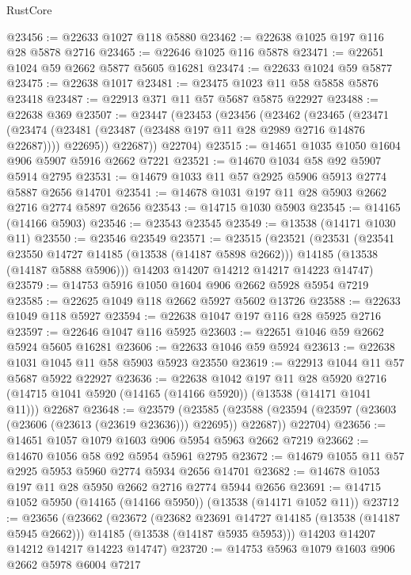 \begin{lexlean}{RustCore}
\begin{coremodule}
@23456 := @22633 @1027 @118 @5880
@23462 := @22638 @1025 @197 @116 @28 @5878 @2716
@23465 := @22646 @1025 @116 @5878
@23471 := @22651 @1024 @59 @2662 @5877 @5605 @16281
@23474 := @22633 @1024 @59 @5877
@23475 := @22638 @1017
@23481 := @23475 @1023 @11 @58 @5858 @5876 @23418
@23487 := @22913 @371 @11 @57 @5687 @5875 @22927
@23488 := @22638 @369
@23507 := @23447
    (@23453
      (@23456
        (@23462
          (@23465
            (@23471
              (@23474 (@23481 (@23487 (@23488 @197 @11 @28 @2989 @2716 @14876 @22687))))
              @22695))
          @22687))
      @22704)
@23515 := @14651 @1035 @1050 @1604 @906 @5907 @5916 @2662 @7221
@23521 := @14670 @1034 @58 @92 @5907 @5914 @2795
@23531 := @14679 @1033 @11 @57 @2925 @5906 @5913 @2774 @5887 @2656 @14701
@23541 := @14678 @1031 @197 @11 @28 @5903 @2662 @2716 @2774 @5897 @2656
@23543 := @14715 @1030 @5903
@23545 := @14165 (@14166 @5903)
@23546 := @23543 @23545
@23549 := @13538 (@14171 @1030 @11)
@23550 := @23546 @23549
@23571 := @23515
    (@23521
      (@23531
        (@23541 @23550 @14727 @14185 (@13538 (@14187 @5898 @2662)))
        @14185
        (@13538 (@14187 @5888 @5906)))
      @14203
      @14207
      @14212
      @14217
      @14223
      @14747)
@23579 := @14753 @5916 @1050 @1604 @906 @2662 @5928 @5954 @7219
@23585 := @22625 @1049 @118 @2662 @5927 @5602 @13726
@23588 := @22633 @1049 @118 @5927
@23594 := @22638 @1047 @197 @116 @28 @5925 @2716
@23597 := @22646 @1047 @116 @5925
@23603 := @22651 @1046 @59 @2662 @5924 @5605 @16281
@23606 := @22633 @1046 @59 @5924
@23613 := @22638 @1031 @1045 @11 @58 @5903 @5923 @23550
@23619 := @22913 @1044 @11 @57 @5687 @5922 @22927
@23636 := @22638
    @1042
    @197
    @11
    @28
    @5920
    @2716
    (@14715 @1041 @5920 (@14165 (@14166 @5920)) (@13538 (@14171 @1041 @11)))
    @22687
@23648 := @23579
    (@23585
      (@23588 (@23594 (@23597 (@23603 (@23606 (@23613 (@23619 @23636))) @22695)) @22687))
      @22704)
@23656 := @14651 @1057 @1079 @1603 @906 @5954 @5963 @2662 @7219
@23662 := @14670 @1056 @58 @92 @5954 @5961 @2795
@23672 := @14679 @1055 @11 @57 @2925 @5953 @5960 @2774 @5934 @2656 @14701
@23682 := @14678 @1053 @197 @11 @28 @5950 @2662 @2716 @2774 @5944 @2656
@23691 := @14715 @1052 @5950 (@14165 (@14166 @5950)) (@13538 (@14171 @1052 @11))
@23712 := @23656
    (@23662
      (@23672
        (@23682 @23691 @14727 @14185 (@13538 (@14187 @5945 @2662)))
        @14185
        (@13538 (@14187 @5935 @5953)))
      @14203
      @14207
      @14212
      @14217
      @14223
      @14747)
@23720 := @14753 @5963 @1079 @1603 @906 @2662 @5978 @6004 @7217

\end{coremodule}
\end{lexlean}
